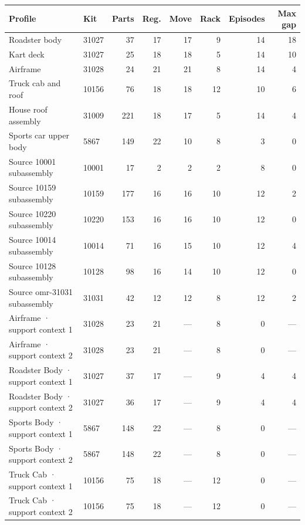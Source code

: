 \begin{tabular}{llrrrrrr}\toprule
Profile & Kit & Parts & Reg. & Move & Rack & Episodes & Max gap\\\midrule
Roadster body & 31027 & 37 & 17 & 17 & 9 & 14 & 18\\
Kart deck & 31027 & 25 & 18 & 18 & 5 & 14 & 10\\
Airframe & 31028 & 24 & 21 & 21 & 8 & 14 & 4\\
Truck cab and roof & 10156 & 76 & 18 & 18 & 12 & 10 & 6\\
House roof assembly & 31009 & 221 & 18 & 17 & 5 & 14 & 4\\
Sports car upper body & 5867 & 149 & 22 & 10 & 8 & 3 & 0\\
Source 10001 subassembly & 10001 & 17 & 2 & 2 & 2 & 8 & 0\\
Source 10159 subassembly & 10159 & 177 & 16 & 16 & 10 & 12 & 2\\
Source 10220 subassembly & 10220 & 153 & 16 & 16 & 10 & 12 & 0\\
Source 10014 subassembly & 10014 & 71 & 16 & 15 & 10 & 12 & 4\\
Source 10128 subassembly & 10128 & 98 & 16 & 14 & 10 & 12 & 0\\
Source omr-31031 subassembly & 31031 & 42 & 12 & 12 & 8 & 12 & 2\\
Airframe · support context 1 & 31028 & 23 & 21 & --- & 8 & 0 & ---\\
Airframe · support context 2 & 31028 & 23 & 21 & --- & 8 & 0 & ---\\
Roadster Body · support context 1 & 31027 & 37 & 17 & --- & 9 & 4 & 4\\
Roadster Body · support context 2 & 31027 & 36 & 17 & --- & 9 & 4 & 4\\
Sports Body · support context 1 & 5867 & 148 & 22 & --- & 8 & 0 & ---\\
Sports Body · support context 2 & 5867 & 148 & 22 & --- & 8 & 0 & ---\\
Truck Cab · support context 1 & 10156 & 75 & 18 & --- & 12 & 0 & ---\\
Truck Cab · support context 2 & 10156 & 75 & 18 & --- & 12 & 0 & ---\\
\bottomrule\end{tabular}
